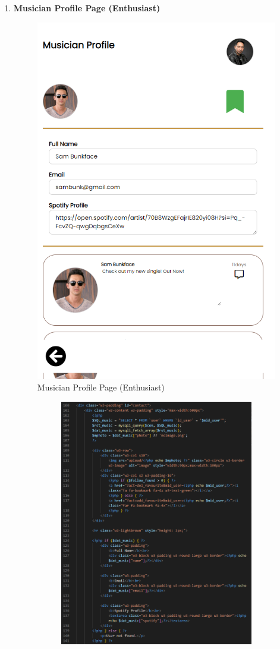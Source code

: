 \begin{enumerate}[1.]
    \item \textbf{Musician Profile Page (Enthusiast)}
    \begin{figure}[h]
        \centering
        \includegraphics[width=0.5\linewidth]{mainmatter/images/frontend/ss/Musician Profile (Enthusiast).png}
        \caption{Musician Profile Page (Enthusiast)}
        \label{fig:myfig64}
    \end{figure}
    \begin{figure}[h]\ContinuedFloat
        \centering
        \begin{subfigure}[b]{0.6\textwidth}
            \centering
            \includegraphics[width=\textwidth]{mainmatter/images/frontend/code/emprofile.png}

\end{subfigure}
\end{figure}
\end{enumerate}
